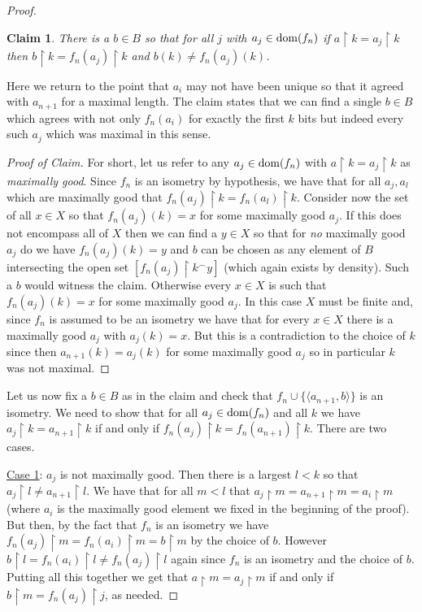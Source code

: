\documentclass[leqno,11pt]{amsart}
\newtheorem{claim}[theorem]{Claim}
\theoremstyle{definition}
\theoremstyle{remark}
\def\hook{\upharpoonright}
\begin{document}
\begin{proof}
\begin{claim}
There is a $b \in B$ so that for all $j$ with $a_j \in {\rm dom}(f_n)$ if $a \hook k = a_j \hook k$ then $b \hook k = f_n(a_j) \hook k$ and $b(k) \neq f_n(a_j)(k)$.
\end{claim}

Here we return to the point that $a_i$ may not have been unique so that it agreed with $a_{n+1}$ for a maximal length. The claim states that we can find a single $b \in B$ which agrees with not only $f_n(a_i)$ for exactly the first $k$ bits but indeed every such $a_j$ which was maximal in this sense.

\begin{proof}[Proof of Claim]
For short, let us refer to any $a_j \in {\rm dom}(f_n)$ with $a \hook k = a_j \hook k$ as {\em maximally good}. Since $f_n$ is an isometry by hypothesis, we have that for all $a_j, a_l$ which are maximally good that $f_n(a_j) \hook k = f_n(a_l) \hook k$. Consider now the set of all $x \in X$ so that $f_n(a_j)(k) = x$ for some maximally good $a_j$. If this does not encompass all of $X$ then we can find a $y \in X$ so that for {\em no} maximally good $a_j$ do we have $f_n(a_j)(k) = y$ and $b$ can be chosen as any element of $B$ intersecting the open set $[f_n(a_j) \hook k^\frown y]$ (which again exists by density). Such a $b$ would witness the claim. Otherwise every $x \in X$ is such that $f_n(a_j)(k) = x$ for some maximally good $a_j$. In this case $X$ must be finite and, since $f_n$ is assumed to be an isometry we have that for every $x \in X$ there is a maximally good $a_j$ with $a_j(k) = x$. But this is a contradiction to the choice of $k$ since then $a_{n+1}(k) = a_j(k)$ for some maximally good $a_j$ so in particular $k$ was not maximal.
\end{proof}

Let us now fix a $b \in B$ as in the claim and check that $f_{n} \cup \{\langle a_{n+1}, b\rangle\}$ is an isometry. We need to show that for all $a_j \in {\rm dom}(f_n)$ and all $k$ we have $a_j \hook k = a_{n+1} \hook k$ if and only if $f_n(a_j) \hook k = f_n(a_{n+1}) \hook k$. There are two cases.  

    \noindent \underline{Case 1}: $a_j$ is not maximally good. Then there is a largest $l < k$ so that $a_j \hook l \neq a_{n+1} \hook l$. We have that for all $m < l$ that $a_j \hook m = a_{n+1} \hook m = a_i \hook m$ (where $a_i$ is the maximally good element we fixed in the beginning of the proof). But then, by the fact that $f_n$ is an isometry we have $f_n (a_j) \hook m = f_n (a_i) \hook m = b\hook m$ by the choice of $b$. However $b \hook l = f_n(a_i) \hook l\neq f_n(a_j)\hook l$ again since $f_n$ is an isometry and the choice of $b$. Putting all this together we get that $a\hook m = a_j\hook m$ if and only if $b \hook m = f_n(a_j)\hook j$, as needed.


\end{proof}
\end{document}
